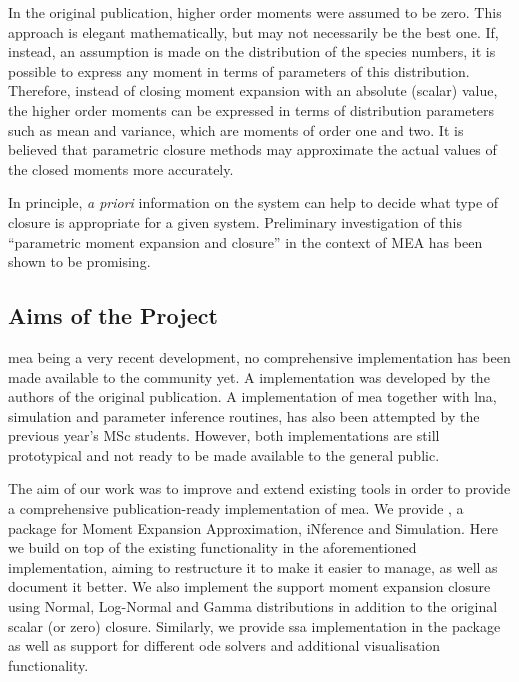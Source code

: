 In the original publication\cite{ale_general_2013}, higher order moments were assumed to be zero. 
This approach is elegant mathematically, but may not necessarily be the best one.
If, instead, an assumption is made on the distribution of the species numbers, it is possible
to express any moment in terms of parameters of this distribution\cite{milner_moment_2011}.
Therefore, instead of closing moment expansion with an absolute (scalar) value, the higher order moments can be expressed in
terms of distribution parameters such as mean and variance, which are moments of order one and two. 
It is believed that parametric closure methods may approximate the actual values of the closed moments more accurately.

In principle, \emph{a priori} information on the system can help to decide what type of closure is appropriate for a given system.
Preliminary investigation of this ``parametric moment expansion and closure'' in the context of MEA has been shown to be promising\cite{lakatos_preparation_2014}.

\subsection{Aims of the Project}
\label{sec:aims_of_the_project}

\gls{mea} being a very recent development, no comprehensive implementation has been made available to the community yet.
A \mat{} implementation was developed by the authors of the original publication. A \py{} implementation of \gls{mea} together with \gls{lna}, simulation and parameter inference routines, has also been attempted by the previous year's MSc students\cite{babtie_moment_2013}.
However, both implementations are still prototypical and not ready to be made available to the general public.
 
The aim of our work was to improve and extend existing tools in order to provide a comprehensive publication-ready implementation of \gls{mea}.
We provide \means{}, a \py{} package for Moment Expansion Approximation, iNference and Simulation. 
Here we build on top of the existing functionality in the aforementioned \py{} implementation, aiming to restructure it to make it easier to manage, as well as document it better. 
We also implement the support moment expansion closure using Normal, Log-Normal and Gamma distributions in addition to the original scalar (or zero) closure. Similarly, we provide \gls{ssa} implementation in the package as well as support for different \gls{ode} solvers and additional visualisation functionality.

